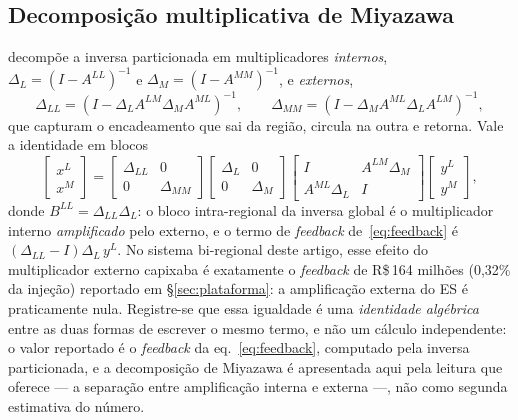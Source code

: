 \documentclass[11pt,a4paper]{article}
\begin{document}
\subsection{Decomposição multiplicativa de Miyazawa}
\label{ap:miyazawa}
\citet{miyazawa1966} decompõe a inversa particionada em multiplicadores \emph{internos},
$\Delta_L=(I-A^{LL})^{-1}$ e $\Delta_M=(I-A^{MM})^{-1}$, e \emph{externos},
\begin{equation}
\Delta_{LL}=(I-\Delta_L A^{LM}\Delta_M A^{ML})^{-1},
\qquad
\Delta_{MM}=(I-\Delta_M A^{ML}\Delta_L A^{LM})^{-1},
\label{eq:miyazawa_ext}
\end{equation}
que capturam o encadeamento que sai da região, circula na outra e retorna. Vale a
identidade em blocos
\begin{equation}
\begin{bmatrix} x^{L}\\ x^{M}\end{bmatrix}
=\begin{bmatrix} \Delta_{LL} & 0\\ 0 & \Delta_{MM}\end{bmatrix}
\begin{bmatrix} \Delta_{L} & 0\\ 0 & \Delta_{M}\end{bmatrix}
\begin{bmatrix} I & A^{LM}\Delta_{M}\\ A^{ML}\Delta_{L} & I\end{bmatrix}
\begin{bmatrix} y^{L}\\ y^{M}\end{bmatrix},
\label{eq:miyazawa}
\end{equation}
donde $B^{LL}=\Delta_{LL}\Delta_L$: o bloco intra-regional da inversa global é o
multiplicador interno \emph{amplificado} pelo externo, e o termo de \emph{feedback}
de~\eqref{eq:feedback} é $(\Delta_{LL}-I)\Delta_L\,y^{L}$. No sistema bi-regional deste
artigo, esse efeito do multiplicador externo capixaba é exatamente o \emph{feedback} de
R\$\,164 milhões (0,32\% da injeção) reportado em \S\ref{sec:plataforma}: a amplificação
externa do ES é praticamente nula. Registre-se que essa igualdade é uma \emph{identidade
algébrica} entre as duas formas de escrever o mesmo termo, e não um cálculo independente: o
valor reportado é o \emph{feedback} da eq.~\eqref{eq:feedback}, computado pela inversa
particionada, e a decomposição de Miyazawa é apresentada aqui pela leitura que oferece --- a
separação entre amplificação interna e externa ---, não como segunda estimativa do número.
\end{document}
